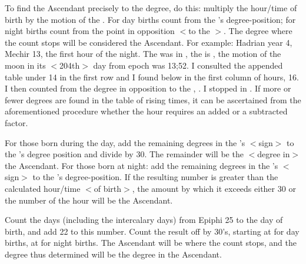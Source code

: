 To find the Ascendant precisely to the degree, do this: multiply the hour/time of birth by the motion of the \Moon. For day births count from the \Sun’s degree-position; for night births count from the point in opposition $<$to the \Sun$>$. The degree where the count stops will be considered the Ascendant. For example: Hadrian year 4, Mechir 13, the first hour of the night. The \Sun\xspace was in \Aquarius\xspace 22\deg, the \Moon\xspace is
\Scorpio\xspace 7\deg, the motion of the moon in its $<$204th$>$ day from epoch was 13;52\deg. I consulted the appended
table under 14 in the first row and I found below in the first column of hours, 16. I then counted from the degree in opposition to the \Sun, \Leo\xspace 22\deg. I stopped in \deg. If more or fewer degrees are found in the table of rising times, it can be ascertained from the aforementioned procedure whether the hour requires an added or a subtracted factor.

For those born during the day, add the remaining degrees in the \Sun’s $<$sign$>$ to the \Moon’s degree position and divide by 30. The remainder will be the $<$degree in$>$ the Ascendant. For those born at night: add the remaining degrees in the \Moon’s $<$sign$>$ to the \Sun’s degree-position. If the resulting number is
greater than the calculated hour/time $<$of birth$>$, the amount by which it exceeds either 30 or the number of the hour will be the Ascendant.

Count the days (including the intercalary days) from Epiphi 25 to the day of birth, and add 22 to this number. Count the result off by 30’s, starting at \Cancer\xspace for day births, at \Capricorn\xspace for night births. The Ascendant will be where the count stops, and the degree thus determined will be the degree in the Ascendant.

\newpage